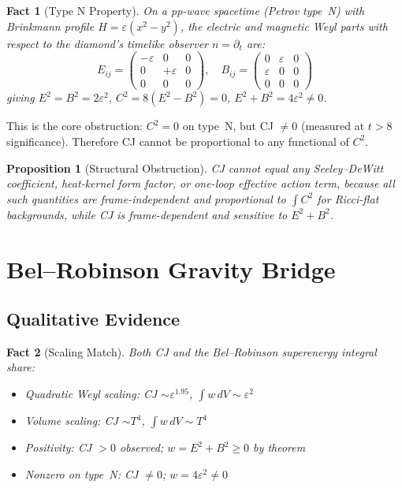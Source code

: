 \documentclass[11pt,a4paper]{article}
\newtheorem{proposition}{Proposition}
\newtheorem{fact}{Fact}
\begin{document}
\begin{fact}[Type N Property]
On a pp-wave spacetime (Petrov type~N) with Brinkmann profile $H = \varepsilon(x^2-y^2)$, the electric and magnetic Weyl parts with respect to the diamond's timelike observer $n = \partial_t$ are:
\begin{equation}
E_{ij} = \begin{pmatrix} -\varepsilon & 0 & 0 \\ 0 & +\varepsilon & 0 \\ 0 & 0 & 0 \end{pmatrix}, \quad
B_{ij} = \begin{pmatrix} 0 & \varepsilon & 0 \\ \varepsilon & 0 & 0 \\ 0 & 0 & 0 \end{pmatrix}
\end{equation}
giving $E^2 = B^2 = 2\varepsilon^2$, $C^2 = 8(E^2-B^2) = 0$, $E^2+B^2 = 4\varepsilon^2 \neq 0$.
\end{fact}

This is the core obstruction: $C^2 = 0$ on type~N, but CJ $\neq 0$ (measured at $t > 8$ significance). Therefore CJ cannot be proportional to any functional of $C^2$.

\begin{proposition}[Structural Obstruction]
CJ cannot equal any Seeley--DeWitt coefficient, heat-kernel form factor, or one-loop effective action term, because all such quantities are frame-independent and proportional to $\int C^2$ for Ricci-flat backgrounds, while CJ is frame-dependent and sensitive to $E^2+B^2$.
\end{proposition}

\section{Bel--Robinson Gravity Bridge}

\subsection{Qualitative Evidence}

\begin{fact}[Scaling Match]
Both CJ and the Bel--Robinson superenergy integral share:
\begin{itemize}
\item Quadratic Weyl scaling: CJ $\sim \varepsilon^{1.95}$, $\int w\,dV \sim \varepsilon^2$
\item Volume scaling: CJ $\sim T^4$, $\int w\,dV \sim T^4$
\item Positivity: CJ $> 0$ observed; $w = E^2+B^2 \geq 0$ by theorem
\item Nonzero on type~N: CJ $\neq 0$; $w = 4\varepsilon^2 \neq 0$
\end{itemize}
\end{fact}
\end{document}
